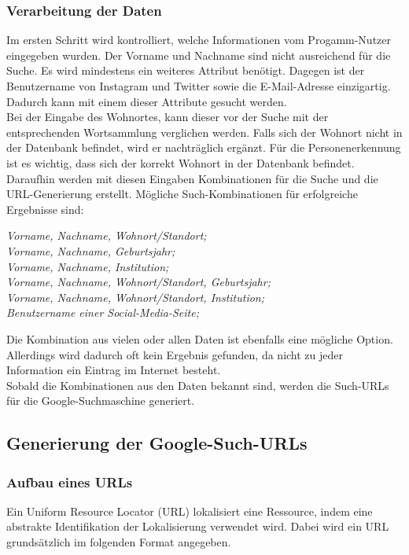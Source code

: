 		\subsubsection{Verarbeitung der Daten}
		Im ersten Schritt wird kontrolliert, welche Informationen vom Progamm-Nutzer eingegeben wurden. Der Vorname und Nachname sind nicht ausreichend für die Suche. Es wird mindestens ein weiteres Attribut benötigt. Dagegen ist der Benutzername von Instagram und Twitter sowie die E-Mail-Adresse einzigartig. Dadurch kann mit einem dieser Attribute gesucht werden.\\
		Bei der Eingabe des Wohnortes, kann dieser vor der Suche mit der entsprechenden Wortsammlung verglichen werden. Falls sich der Wohnort nicht in der Datenbank befindet, wird er nachträglich ergänzt. Für die Personenerkennung ist es wichtig, dass sich der korrekt Wohnort in der Datenbank befindet.\\
		Daraufhin werden mit diesen Eingaben Kombinationen für die Suche und die URL-Generierung erstellt. Mögliche Such-Kombinationen für erfolgreiche Ergebnisse sind:
		
		\textit{Vorname, Nachname, Wohnort/Standort;}\\
		\textit{Vorname, Nachname, Geburtsjahr;}\\
		\textit{Vorname, Nachname, Institution;}\\
		\textit{Vorname, Nachname, Wohnort/Standort, Geburtsjahr;}\\
		\textit{Vorname, Nachname, Wohnort/Standort, Institution;}\\
		\textit{Benutzername einer Social-Media-Seite;}
		
		
		Die Kombination aus vielen oder allen Daten ist ebenfalls eine mögliche Option. Allerdings wird dadurch oft kein Ergebnis gefunden, da nicht zu jeder Information ein Eintrag im Internet besteht.\\
		Sobald die Kombinationen aus den Daten bekannt sind, werden die Such-URLs für die Google-Suchmaschine generiert.
		\subsection{Generierung der Google-Such-URLs}
			\subsubsection{Aufbau eines URLs}
			\label{subsec:AufbauURL}
			Ein Uniform Resource Locator (URL) lokalisiert eine Ressource, indem eine abstrakte Identifikation der Lokalisierung verwendet wird. Dabei wird ein URL grundsätzlich im folgenden Format angegeben.\cite{RFC1738}
			
